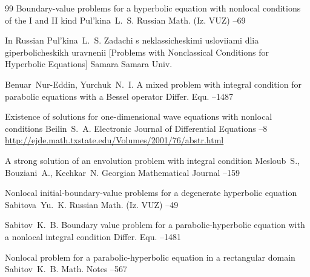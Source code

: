 \begin{thebibliography}{99}
\paper Boundary-value problems for a hyperbolic equation with nonlocal conditions of the I and II kind
\by  Pul'kina~L.~S.
\jour Russian Math. (Iz. VUZ)
--69

\lang In Russian
\by Pul'kina~L.~S.
\book Zadachi s neklassicheskimi usloviiami dlia giperbolicheskikh uravnenii \rm [Problems with Nonclassical Conditions for Hyperbolic Equations]
\publaddr Samara
\publ Samara  Univ.


\by Benuar~Nur-Eddin, Yurchuk~N.~I.
\paper A mixed problem with integral condition for parabolic equations with a Bessel operator
\jour Differ. Equ.
--1487

\paper Existence of solutions for one-dimensional wave equations with nonlocal conditions
\by Beilin~S.~A.
\jour Electronic Journal of Differential Equations
--8
\elink \url{http://ejde.math.txstate.edu/Volumes/2001/76/abstr.html}

\paper A strong solution of an envolution problem with integral condition
\by  Mesloub~S., Bouziani~A.,  Kechkar~N.
\jour Georgian Mathematical Journal
--159


\paper Nonlocal initial-boundary-value problems for a degenerate hyperbolic equation
\by  Sabitova~Yu.~K.
\jour Russian Math. (Iz. VUZ)
--49


\by Sabitov~K.~B.
\paper Boundary value problem for a parabolic-hyperbolic equation with a nonlocal integral condition
\jour Differ. Equ.
--1481 


\paper Nonlocal problem for a parabolic-hyperbolic equation in a rectangular domain
\by Sabitov~K.~B.
\jour Math. Notes
--567


\end{thebibliography}
